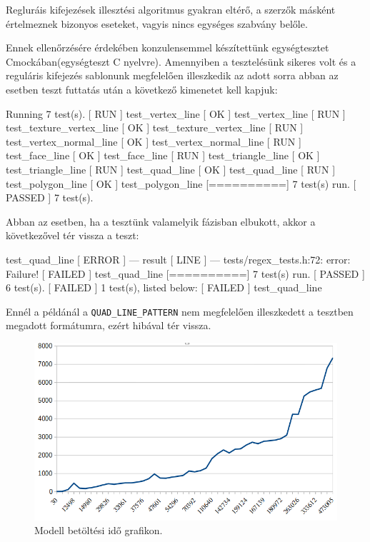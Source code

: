 

Regluráis kifejezések illesztési algoritmus gyakran eltérő, a szerzők másként értelmeznek bizonyos eseteket, vagyis nincs egységes szabvány belőle.

Ennek ellenőrzésére érdekében konzulensemmel készítettünk egységtesztet Cmockában(egységteszt C nyelvre). Amennyiben a tesztelésünk sikeres volt és a reguláris kifejezés sablonunk megfelelően illeszkedik az adott sorra abban az esetben teszt futtatás után a következő kimenetet kell kapjuk:
\bigskip
\begin{python}
[==========] Running 7 test(s).
[ RUN      ] test_vertex_line
[       OK ] test_vertex_line
[ RUN      ] test_texture_vertex_line
[       OK ] test_texture_vertex_line
[ RUN      ] test_vertex_normal_line
[       OK ] test_vertex_normal_line
[ RUN      ] test_face_line
[       OK ] test_face_line
[ RUN      ] test_triangle_line
[       OK ] test_triangle_line
[ RUN      ] test_quad_line
[       OK ] test_quad_line
[ RUN      ] test_polygon_line
[       OK ] test_polygon_line
[==========] 7 test(s) run.
[  PASSED  ] 7 test(s).
\end{python}
\newpage

\noindent Abban az esetben, ha a tesztünk valamelyik fázisban elbukott, akkor a következővel tér vissza a teszt:
\begin{python}
[ RUN      ] test_quad_line
[  ERROR   ] --- result
[   LINE   ] --- tests/regex_tests.h:72: error: Failure!
[  FAILED  ] test_quad_line
[==========] 7 test(s) run.
[  PASSED  ] 6 test(s).
[  FAILED  ] 1 test(s), listed below:
[  FAILED  ] test_quad_line
\end{python}
Ennél a példánál a \texttt{QUAD\_LINE\_PATTERN} nem megfelelően illeszkedett  a tesztben megadott formátumra, ezért hibával tér vissza.

\begin{figure}[h]
\centering
\includegraphics[width=\textwidth]{images/betoltesiido.png}
\caption{Modell betöltési idő grafikon.}
\label{fig:betolt}
\end{figure}


